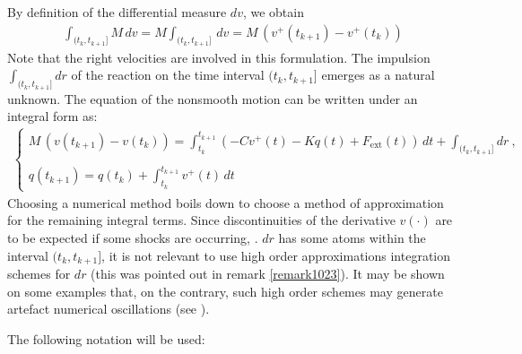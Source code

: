 By definition of the differential measure $dv$, we obtain
\begin{eqnarray}
\label{eq:19}
&  \displaystyle \int_{(t_k,t_{k+1}]} M \,dv = M \int_{(t_k,t_{k+1}]}\,dv = M\,(v^+(t_{k+1})-v^+(t_{k}))  &
\end{eqnarray}
Note that the right velocities are involved in this formulation.  The impulsion $\displaystyle \int_{(t_k,t_{k+1}]} dr$ of the reaction on the time interval $(t_k,t_{k+1}]$ emerges  as a natural unknown. The equation of the nonsmooth motion can be written under an integral form as:
\begin{eqnarray}
  \begin{cases}
     M\,(v(t_{k+1})-v(t_{k})) =   \displaystyle   \int_{t_k}^{t_{k+1}} (- C v^+(t)
      - K q(t) +  F_{\mathrm{ext}}(t))\,dt +
        \displaystyle \int_{(t_k,t_{k+1}]} dr \:, \\ \\
     q(t_{k+1}) = q(t_{k}) + \displaystyle \int_{t_k}^{t_{k+1}} v^+(t)\,dt 
   \end{cases}
\end{eqnarray}
%
Choosing a numerical method boils down to choose a method of approximation for the remaining integral terms. Since discontinuities of the derivative  $v(\cdot)$ are to be expected if some shocks are occurring, \ie{}. $dr$  has some  atoms within the interval $(t_k,t_{k+1}]$, it is not relevant to use high order approximations  integration schemes for $dr$ (this was pointed out in remark \ref{remark1023}). It may be shown on some examples that, on the contrary, such high order schemes may generate artefact numerical oscillations (see \citep{Vola.Pratt.ea98}). 




The following notation will be used: 

